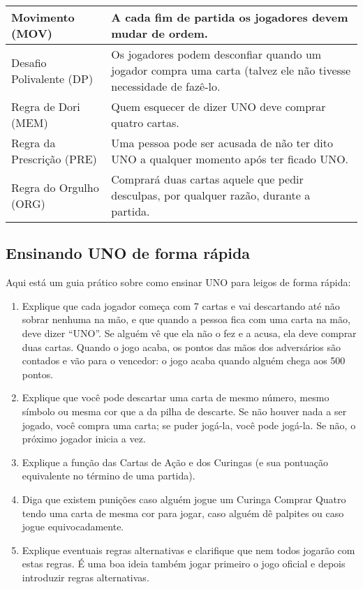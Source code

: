 \begin{center}
\begin{longtable}{|p{4cm}|p{6.5cm}|}
Movimento (MOV) & A cada fim de partida os jogadores devem mudar de ordem. \\ \hline
Desafio Polivalente (DP) & Os jogadores podem desconfiar quando um jogador compra uma carta (talvez ele não tivesse necessidade de fazê-lo. \\ \hline
Regra de Dori (MEM) & Quem esquecer de dizer UNO deve comprar quatro cartas. \\ \hline
Regra da Prescrição (PRE) & Uma pessoa pode ser acusada de não ter dito UNO a qualquer momento após ter ficado UNO. \\ \hline
Regra do Orgulho (ORG) & Comprará duas cartas aquele que pedir desculpas, por qualquer razão, durante a partida. \\ \hline
\end{longtable}
\end{center}

\subsection{Ensinando UNO de forma rápida}

Aqui está um guia prático sobre como ensinar UNO para leigos de forma rápida:

\begin{enumerate}
\item{Explique que cada jogador começa com 7 cartas e vai descartando até não sobrar nenhuma na mão, e que quando a pessoa fica com uma carta na mão, deve dizer ``UNO''. Se alguém vê que ela não o fez e a acusa, ela deve comprar duas cartas. Quando o jogo acaba, os pontos das mãos dos adversários são contados e vão para o vencedor: o jogo acaba quando alguém chega aos 500 pontos.}
\item{Explique que você pode descartar uma carta de mesmo número, mesmo símbolo ou mesma cor que a da pilha de descarte. Se não houver nada a ser jogado, você compra uma carta; se puder jogá-la, você pode jogá-la. Se não, o próximo jogador inicia a vez.}
\item{Explique a função das Cartas de Ação e dos Curingas (e sua pontuação equivalente no término de uma partida).}
\item{Diga que existem punições caso alguém jogue um Curinga Comprar Quatro tendo uma carta de mesma cor para jogar, caso alguém dê palpites ou caso jogue equivocadamente.}
\item{Explique eventuais regras alternativas e clarifique que nem todos jogarão com estas regras. É uma boa ideia também jogar primeiro o jogo oficial e depois introduzir regras alternativas.}
\end{enumerate}

